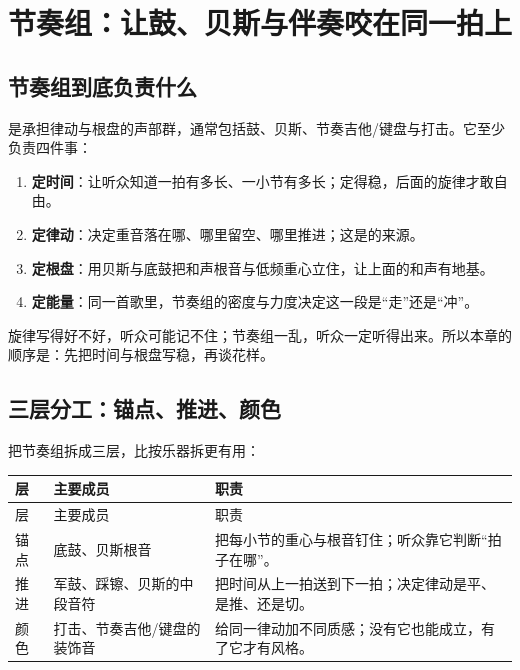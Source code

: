 \chapter{节奏组：让鼓、贝斯与伴奏咬在同一拍上}
\label{ch:rhythm}


\section{节奏组到底负责什么}
\label{sec:rhythm-job}

是承担律动与根盘的声部群，通常包括鼓、贝斯、节奏吉他/键盘与打击。它至少负责四件事：

\begin{enumerate}
\item \textbf{定时间}：让听众知道一拍有多长、一小节有多长；定得稳，后面的旋律才敢自由。
\item \textbf{定律动}：决定重音落在哪、哪里留空、哪里推进；这是的来源。
\item \textbf{定根盘}：用贝斯与底鼓把和声根音与低频重心立住，让上面的和声有地基。
\item \textbf{定能量}：同一首歌里，节奏组的密度与力度决定这一段是“走”还是“冲”。
\end{enumerate}

旋律写得好不好，听众可能记不住；节奏组一乱，听众一定听得出来。所以本章的顺序是：先把时间与根盘写稳，再谈花样。

\section{三层分工：锚点、推进、颜色}
\label{sec:rhythm-layers}

把节奏组拆成三层，比按乐器拆更有用：

\begin{longtable}{p{}p{}p{}}
\toprule
层 & 主要成员 & 职责 \\
\midrule
\endfirsthead
\toprule
层 & 主要成员 & 职责 \\
\midrule
\endhead
锚点 & 底鼓、贝斯根音 & 把每小节的重心与根音钉住；听众靠它判断“拍子在哪”。 \\
推进 & 军鼓、踩镲、贝斯的中段音符 & 把时间从上一拍送到下一拍；决定律动是平、是推、还是切。 \\
颜色 & 打击、节奏吉他/键盘的装饰音 & 给同一律动加不同质感；没有它也能成立，有了它才有风格。 \\
\bottomrule
\end{longtable}

